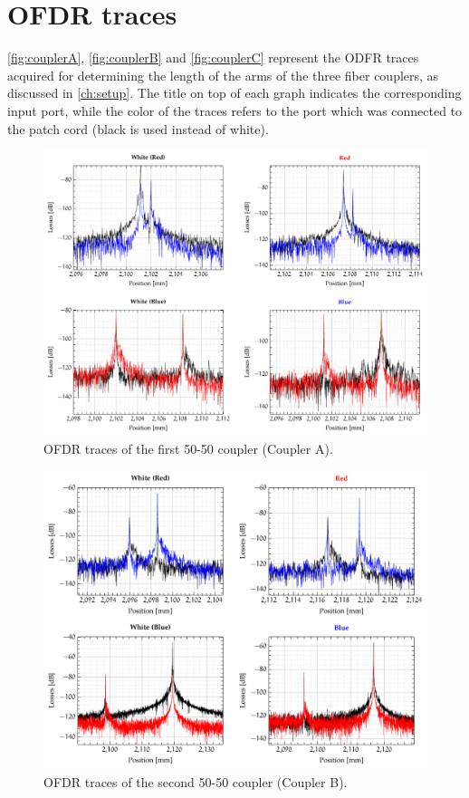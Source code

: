 
\chapter{OFDR traces}
\label{ch:appendixA}
 \autoref{fig:couplerA}, \autoref{fig:couplerB} and \autoref{fig:couplerC} represent the ODFR traces acquired for determining the length of the arms of the three fiber couplers, as discussed in \autoref{ch:setup}. The title on top of each graph indicates the corresponding input port, while the color of the traces refers to the port which was connected to the patch cord (black is used  instead of white).
 
\begin{figure}[hbt]
	\myfloatalign
	\includegraphics[width=\linewidth]{gfx/ch3/couplers/couplerA}
	\caption{OFDR traces of the first 50-50 coupler (Coupler A).}\label{fig:couplerA}
\end{figure}

\begin{figure}[hbt]
	\myfloatalign
	\includegraphics[width=\linewidth]{gfx/ch3/couplers/couplerB}
	\caption{OFDR traces of the second 50-50 coupler (Coupler B).}\label{fig:couplerB}
\end{figure}

